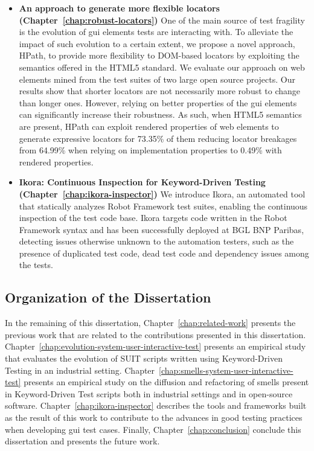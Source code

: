 \begin{itemize}
    \item \textbf{An approach to generate more flexible locators (Chapter~\ref{chap:robust-locators})} One of the main source of test fragility is the evolution of \gls{gui} elements tests are interacting with. To alleviate the impact of such evolution to a certain extent, we propose a novel approach, HPath, to provide more flexibility to DOM-based locators by exploiting the semantics offered in the HTML5 standard. We evaluate our approach on web elements mined from the test suites of two large open source projects. Our results show that shorter locators are not necessarily more robust to change than longer ones. However, relying on better properties of the \gls{gui} elements can significantly increase their robustness. As such, when HTML5 semantics are present, HPath can exploit rendered properties of web elements to generate expressive locators for 73.35\% of them reducing locator breakages from 64.99\% when relying on implementation properties to 0.49\% with rendered properties.
    
    \item \textbf{Ikora: Continuous Inspection for Keyword-Driven Testing (Chapter~\ref{chap:ikora-inspector})} We introduce Ikora, an automated tool that statically analyzes Robot Framework test suites, enabling the continuous inspection of the test code base. Ikora targets code written in the Robot Framework syntax and has been successfully deployed at BGL BNP Paribas, detecting issues otherwise unknown to the automation testers, such as the presence of duplicated test code, dead test code and dependency issues among the tests.
\end{itemize}

\subsection{Organization of the Dissertation}

In the remaining of this dissertation, Chapter~\ref{chap:related-work} presents the previous work that are related to the contributions presented in this dissertation. Chapter~\ref{chap:evolution-system-user-interactive-test} presents an empirical study that evaluates the evolution of SUIT scripts written using Keyword-Driven Testing in an industrial setting. Chapter~\ref{chap:smells-system-user-interactive-test} presents an empirical study on the diffusion and refactoring of smells present in Keyword-Driven Test scripts both in industrial settings and in open-source software. Chapter~\ref{chap:ikora-inspector} describes the tools and frameworks built as the result of this work to contribute to the advances in good testing practices when developing \gls{gui} test cases. Finally, Chapter~\ref{chap:conclusion} conclude this dissertation and presents the future work.